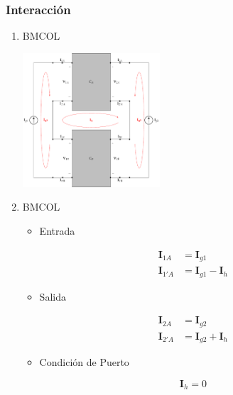 \subsubsection{Interacción}
\label{sec:org9daf72f}
\begin{enumerate}
\item \hfill{}\textsc{BMCOL}
\label{sec:orgfd071da}
\begin{center}
\includegraphics[height=5cm]{../figs/serie-serie-interaccion.pdf}
\end{center}
\item \hfill{}\textsc{BMCOL}
\label{sec:org009a6eb}
\begin{itemize}
\item Entrada
\end{itemize}
\begin{align*}
  \mathbf{I}_{1A} &= \mathbf{I}_{g1}\\
  \mathbf{I}_{1'A} &= \mathbf{I}_{g1} - \mathbf{I}_h
\end{align*}
\begin{itemize}
\item Salida
\end{itemize}
\begin{align*}
  \mathbf{I}_{2A} &= \mathbf{I}_{g2}\\
  \mathbf{I}_{2'A} &= \mathbf{I}_{g2}  + \mathbf{I}_h
\end{align*}
\begin{itemize}
\item Condición de Puerto
\end{itemize}
\[
\boxed{\mathbf{I}_h = 0}
\]
\end{enumerate}
